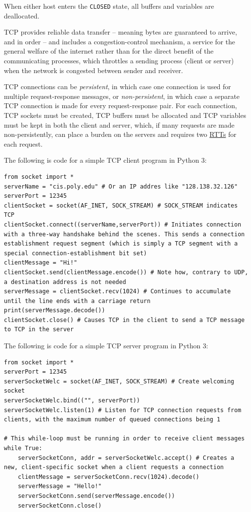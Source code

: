 \documentclass[table, xcdraw]{article}%
\begin{document}
When either host enters the \texttt{CLOSED} state, all buffers and variables are deallocated.

TCP provides reliable data transfer -- meaning bytes are guaranteed to arrive, and in order -- and includes a congestion-control mechanism, a service for the general welfare of the internet rather than for the direct benefit of the communicating processes, which throttles a sending process (client or server) when the network is congested between sender and receiver.

TCP connections can be \emph{persistent}, in which case one connection is used for multiple request-response messages, or \emph{non-persistent}, in which case a separate TCP connection is made for every request-response pair. For each connection, TCP sockets must be created, TCP buffers must be allocated and TCP variables must be kept in both the client and server, which, if many requests are made non-persistently, can place a burden on the servers and requires two \hyperref[ch:intro:delay]{RTTs} for each request.

The following is code for a simple TCP client program in Python 3:

\begin{verbatim}
from socket import *
serverName = "cis.poly.edu" # Or an IP addres like "128.138.32.126"
serverPort = 12345
clientSocket = socket(AF_INET, SOCK_STREAM) # SOCK_STREAM indicates TCP
clientSocket.connect((serverName,serverPort)) # Initiates connection with a three-way handshake behind the scenes. This sends a connection establishment request segment (which is simply a TCP segment with a special connection-establishment bit set)
clientMessage = "Hi!"
clientSocket.send(clientMessage.encode()) # Note how, contrary to UDP, a destination address is not needed
serverMessage = clientSocket.recv(1024) # Continues to accumulate until the line ends with a carriage return
print(serverMessage.decode())
clientSocket.close() # Causes TCP in the client to send a TCP message to TCP in the server
\end{verbatim}

The following is code for a simple TCP server program in Python 3:

\begin{verbatim}
from socket import *
serverPort = 12345
serverSocketWelc = socket(AF_INET, SOCK_STREAM) # Create welcoming socket
serverSocketWelc.bind(("", serverPort))
serverSocketWelc.listen(1) # Listen for TCP connection requests from clients, with the maximum number of queued connections being 1

# This while-loop must be running in order to receive client messages
while True:
    serverSocketConn, addr = serverSocketWelc.accept() # Creates a new, client-specific socket when a client requests a connection
    clientMessage = serverSocketConn.recv(1024).decode()
    serverMessage = "Hello!"
    serverSocketConn.send(serverMessage.encode())
    serverSocketConn.close()
\end{verbatim}
\end{document}
